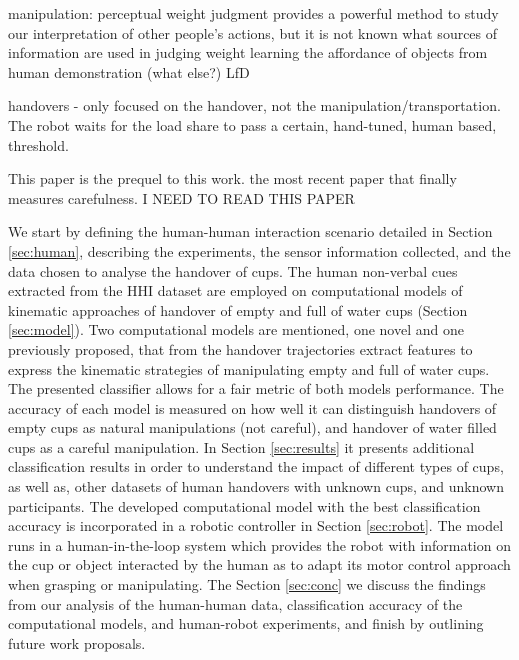 manipulation:
\cite{hamilton_kinematic_2007} perceptual weight judgment provides a powerful method to study our interpretation of other people's actions, but it is not known what sources of information are used in judging weight
\cite{kjellstrom_visual_2011} learning the affordance of objects from human demonstration (what else?)
\cite{santina_learning_2019} LfD

handovers - 
\cite{Medina2016} only focused on the handover, not the manipulation/transportation. The robot waits for the load share to pass a certain, hand-tuned, human based, threshold.

This paper is the prequel to this work.
\cite{lastrico_careful_2021} the most recent paper that finally measures carefulness. I NEED TO READ THIS PAPER

We start by defining the human-human interaction scenario detailed in Section \ref{sec:human}, describing the experiments, the sensor information collected, and the data chosen to analyse the handover of cups. The human non-verbal cues extracted from the HHI dataset are employed on computational models of kinematic approaches of handover of empty and full of water cups (Section \ref{sec:model}). Two computational models are mentioned, one novel and one previously proposed, that from the handover trajectories extract features to express the kinematic strategies of manipulating empty and full of water cups. The presented classifier allows for a fair metric of both models performance. The accuracy of each model is measured on how well it can distinguish handovers of empty cups as natural manipulations (not careful), and handover of water filled cups as a careful manipulation. In Section \ref{sec:results} it presents additional classification results in order to understand the impact of different types of cups, as well as, other datasets of human handovers with unknown cups, and unknown participants. The developed computational model with the best classification accuracy is incorporated in a robotic controller in Section \ref{sec:robot}. The model runs in a human-in-the-loop system which provides the robot with information on the cup or object interacted by the human as to adapt its motor control approach when grasping or manipulating. The Section \ref{sec:conc} we discuss the findings from our analysis of the human-human data, classification accuracy of the computational models, and human-robot experiments, and finish by outlining future work proposals.  

